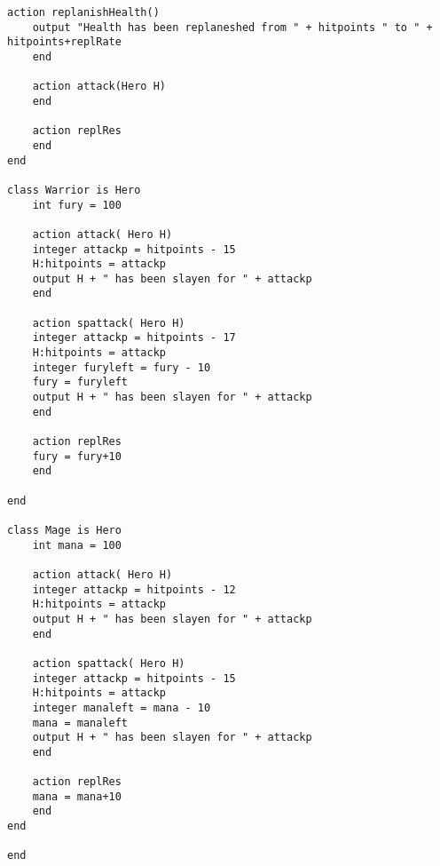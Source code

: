 \begin{lstlisting}[language=Quorum,tabsize=2]
	action replanishHealth()
	output "Health has been replaneshed from " + hitpoints " to " + hitpoints+replRate
	end
	
	action attack(Hero H)
	end
	
	action replRes
	end
end

class Warrior is Hero
	int fury = 100
	
	action attack( Hero H)
	integer attackp = hitpoints - 15
	H:hitpoints = attackp
	output H + " has been slayen for " + attackp
	end
	
	action spattack( Hero H)
	integer attackp = hitpoints - 17
	H:hitpoints = attackp
	integer furyleft = fury - 10
	fury = furyleft
	output H + " has been slayen for " + attackp
	end
	
	action replRes
	fury = fury+10
	end
	
end

class Mage is Hero
	int mana = 100

	action attack( Hero H)
	integer attackp = hitpoints - 12
	H:hitpoints = attackp
	output H + " has been slayen for " + attackp
	end
	
	action spattack( Hero H)
	integer attackp = hitpoints - 15
	H:hitpoints = attackp
	integer manaleft = mana - 10
	mana = manaleft
	output H + " has been slayen for " + attackp
	end
	
	action replRes
	mana = mana+10
	end
end

end
\end{lstlisting}

